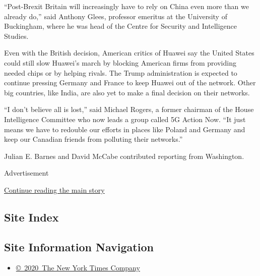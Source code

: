``Post-Brexit Britain will increasingly have to rely on China even more
than we already do,'' said Anthony Glees, professor emeritus at the
University of Buckingham, where he was head of the Centre for Security
and Intelligence Studies.

Even with the British decision, American critics of Huawei say the
United States could still slow Huawei's march by blocking American firms
from providing needed chips or by helping rivals. The Trump
administration is expected to continue pressing Germany and France to
keep Huawei out of the network. Other big countries, like India, are
also yet to make a final decision on their networks.

``I don't believe all is lost,'' said Michael Rogers, a former chairman
of the House Intelligence Committee who now leads a group called 5G
Action Now. ``It just means we have to redouble our efforts in places
like Poland and Germany and keep our Canadian friends from polluting
their networks.''

Julian E. Barnes and David McCabe contributed reporting from Washington.

Advertisement

\protect\hyperlink{after-bottom}{Continue reading the main story}

\hypertarget{site-index}{%
\subsection{Site Index}\label{site-index}}

\hypertarget{site-information-navigation}{%
\subsection{Site Information
Navigation}\label{site-information-navigation}}

\begin{itemize}
\tightlist
\item
  \href{https://help.nytimes.com/hc/en-us/articles/115014792127-Copyright-notice}{©~2020~The
  New York Times Company}
\end{itemize}

